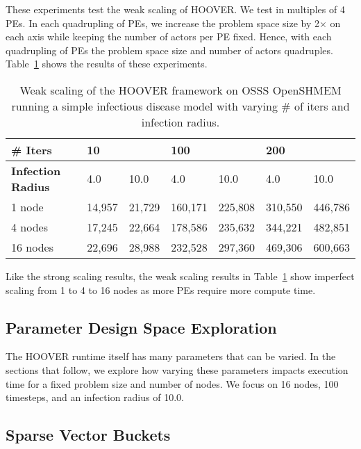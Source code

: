 These experiments test the weak scaling of HOOVER. We test in multiples of 4
PEs. In each quadrupling of PEs, we increase the problem space size by 2$\times$
on each axis while keeping the number of actors per PE fixed. Hence, with each
quadrupling of PEs the problem space size and number of actors quadruples.
Table~\ref{tab:weak_scaling} shows the results of these experiments.

\begin{table}
\centering
\begin{tabularx}{\textwidth}{ | l || X | X | X | X | X | X | }
\hline
\textbf{\# Iters}           & \multicolumn{2}{|X|}{\textbf{10}} & \multicolumn{2}{|X|}{\textbf{100}} & \multicolumn{2}{|X|}{\textbf{200}} \\\hline
\textbf{Infection Radius}   & 4.0          & 10.0         & 4.0           & 10.0          & 4.0           & 10.0 \\\hline
1 node                      & 14,957 & 21,729 & 160,171 & 225,808 & 310,550 & 446,786 \\\hline
4 nodes                     & 17,245 & 22,664 & 178,586 & 235,632 & 344,221 & 482,851 \\\hline
16 nodes                    & 22,696 & 28,988 & 232,528 & 297,360 & 469,306 & 600,663 \\\hline
\end{tabularx}
\caption{Weak scaling of the HOOVER framework on OSSS OpenSHMEM running a
    simple infectious disease model with varying \# of iters and infection
    radius.}
\label{tab:weak_scaling}
\end{table}

Like the strong scaling results, the weak scaling results in
Table~\ref{tab:weak_scaling} show imperfect scaling from 1 to 4 to 16 nodes as
more PEs require more compute time.

\subsection{Parameter Design Space Exploration}

The HOOVER runtime itself has many parameters that can be varied. In the
sections that follow, we explore how varying these parameters impacts execution
time for a fixed problem size and number of nodes. We focus on 16 nodes, 100
timesteps, and an infection radius of 10.0.

\subsection{Sparse Vector Buckets}

